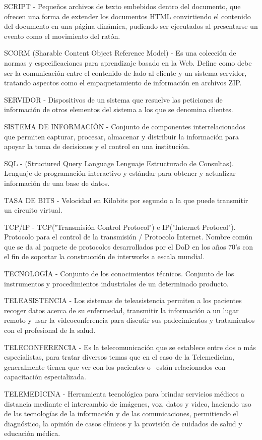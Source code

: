 SCRIPT -  Pequeños archivos de texto embebidos dentro del documento, que ofrecen una forma de extender los documentos HTML convirtiendo el contenido del documento en una página dinámica, pudiendo ser ejecutados al presentarse un evento como el movimiento del ratón.

SCORM (Sharable Content Object Reference Model) - Es una colección de normas y especificaciones para aprendizaje basado en la Web.  Define como debe ser la comunicación entre el contenido de lado al cliente y un sistema servidor, tratando aspectos como el empaquetamiento de información en archivos ZIP.

SERVIDOR - Dispositivos de un sistema que resuelve las peticiones de información de otros elementos del sistema a los que se denomina clientes.

SISTEMA DE INFORMACIÓN - Conjunto de componentes interrelacionados que permiten capturar, procesar, almacenar y distribuir la información para apoyar la toma de decisiones y el control en una institución.


SQL - (Structured Query Language Lenguaje Estructurado de Consultas). Lenguaje de programación interactivo y estándar para obtener y actualizar información de una base de datos.

TASA DE BITS  - Velocidad en Kilobits por segundo a la que puede transmitir un circuito virtual.

TCP/IP - TCP("Transmisión Control Protocol") e IP("Internet Protocol"). Protocolo para el control de la transmisión / Protocolo Internet. Nombre común que se da al paquete de protocolos desarrollados  por el DoD en los años 70’s con el fin de soportar la construcción de interworks a escala mundial.

TECNOLOGÍA - Conjunto de los conocimientos técnicos. Conjunto de los instrumentos y procedimientos industriales de un determinado producto.

TELEASISTENCIA - Los sistemas de teleasistencia permiten a los pacientes recoger datos acerca de su enfermedad, transmitir la información a un lugar remoto y usar la videoconferencia para discutir sus padecimientos y tratamientos con el profesional de la salud.

TELECONFERENCIA - Es la telecomunicación que se establece entre dos o más especialistas, para tratar diversos temas que en el caso de la Telemedicina, generalmente tienen que ver con los pacientes o  están relacionados con capacitación especializada.

TELEMEDICINA - Herramienta tecnológica para brindar servicios médicos a distancia mediante el intercambio de imágenes, voz, datos y video, haciendo uso de las tecnologías de la información y de las comunicaciones, permitiendo el diagnóstico, la opinión de casos clínicos y la provisión de cuidados de salud y educación médica.

